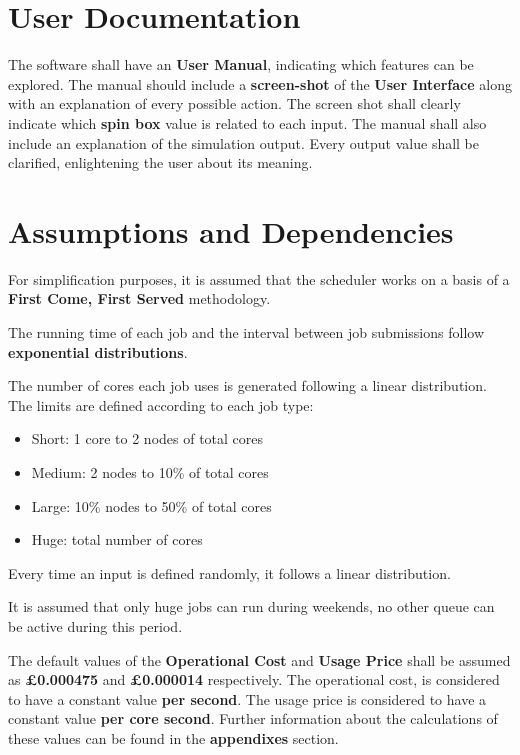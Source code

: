 \documentclass{scrreprt}
\begin{document}


\section{User Documentation}

\par The software shall have an \textbf{User Manual}, indicating which features can be explored. The manual should include a \textbf{screen-shot} of the \textbf{User Interface} along with an explanation of every possible action. The screen shot shall clearly indicate which \textbf{spin box} value is related to each input. The manual shall also include an explanation of the simulation output. Every output value shall be clarified, enlightening the user about its meaning.

\section{Assumptions and Dependencies}

\par For simplification purposes, it is assumed that the scheduler works on a basis of a \textbf{First Come, First Served} methodology. 
\par The running time of each job and the interval between job submissions follow \textbf{exponential distributions}.
\par The number of cores each job uses is generated following a linear distribution. The limits are defined according to each job type:
\begin{itemize}
\item Short: 1 core to 2 nodes of total cores
\item Medium: 2 nodes to 10\% of total cores
\item Large: 10\% nodes to 50\% of total cores
\item Huge: total number of cores
\end{itemize}
\par Every time an input is defined randomly, it follows a linear distribution.
\par It is assumed that only huge jobs can run during weekends, no other queue can be active during this period.
\par The default values of the \textbf{Operational Cost} and \textbf{Usage Price} shall be assumed as \textbf{£0.000475} and \textbf{£0.000014} respectively. The operational cost, is considered to have a constant value \textbf{per second}. The usage price is considered to have a constant value \textbf{per core second}. Further information about the calculations of these values can be found in the \textbf{appendixes} section.
\end{document}
